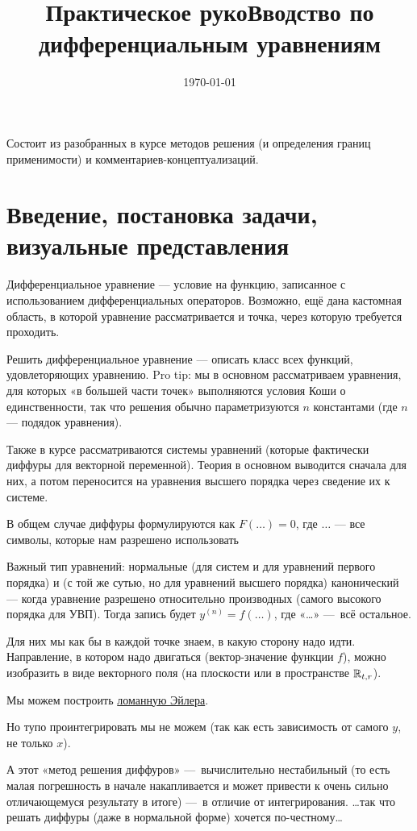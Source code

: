 \documentclass[12pt, a4paper]{article}
\title{Практическое рукоВводство по дифференциальным уравнениям}
\author{
  \vova
}
\date{\today}
\begin{document}
\tittoc

Состоит из разобранных в курсе методов решения (и определения границ применимости) и комментариев-концептуализаций.

\section{Введение, постановка задачи, визуальные представления}

Дифференциальное уравнение — условие на функцию, записанное с использованием дифференциальных операторов.
Возможно, ещё дана кастомная область, в которой уравнение рассматривается и точка, через которую требуется проходить.

Решить дифференциальное уравнение — описать класс всех функций, удовлеторяющих уравнению.
Pro tip: мы в основном рассматриваем уравнения, для которых «в большей части точек» выполняются условия Коши о единственности,
так что решения обычно параметризуются $n$ константами (где $n$ — подядок уравнения).

Также в курсе рассматриваются системы уравнений (которые фактически диффуры для векторной переменной).
Теория в основном выводится сначала для них, а потом переносится на уравнения высшего порядка через сведение их к системе.

В общем случае диффуры формулируются как $F(…) = 0$, где $…$ — все символы, которые нам разрешено использовать

Важный тип уравнений: нормальные (для систем и для уравнений первого порядка) и (с той же сутью, но для уравнений высшего порядка) канонический 
— когда уравнение разрешено относительно производных (самого высокого порядка для УВП). Тогда запись будет $y^{(n)} = f(…)$, где «…» — всё остальное.

Для них мы как бы в каждой точке знаем, в какую сторону надо идти.
Направление, в котором надо двигаться (вектор-значение функции $f$), 
можно изобразить в виде векторного поля (на плоскости или в пространстве ${\mathbb{R}}_{t, r}$).


Мы можем построить \href{
    https://ru.wikipedia.org/wiki/%
}{ломанную Эйлера}.

Но тупо проинтегрировать мы не можем (так как есть зависимость от самого $y$, не только $x$).

А этот «метод решения диффуров» — вычислительно нестабильный (то есть малая погрешность в начале накапливается 
и может привести к очень сильно отличающемуся результату в итоге) — в отличие от интегрирования.
…так что решать диффуры (даже в нормальной форме) хочется по-честному…
\end{document}
